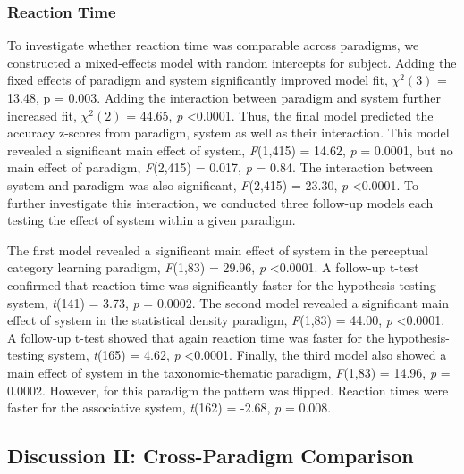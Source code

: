 \documentclass[../dissertation.tex]{subfiles}
\begin{document}
\subsubsection{Reaction Time}
To investigate whether reaction time was comparable across paradigms, we constructed a mixed-effects model with random intercepts for subject. Adding the fixed effects of paradigm and system significantly improved model fit,  $\chi^{2}(3)$ = 13.48, p = 0.003. Adding the interaction between paradigm and system further increased fit,  $\chi^{2}(2)$  = 44.65, \textit{p} \textless 0.0001. Thus, the final model predicted the accuracy z-scores from paradigm, system as well as their interaction. This model revealed a significant main effect of system, \textit{F}(1,415) = 14.62, \textit{p} = 0.0001, but no main effect of paradigm, \textit{F}(2,415) = 0.017, \textit{p} = 0.84. The interaction between system and paradigm was also significant, \textit{F}(2,415) = 23.30, \textit{p} \textless 0.0001. To further investigate this interaction, we conducted three follow-up models each testing the effect of system within a given paradigm. \par
	The first model revealed a significant main effect of system in the perceptual category learning paradigm, \textit{F}(1,83) = 29.96, \textit{p} \textless 0.0001. A follow-up t-test confirmed that reaction time was significantly faster for the hypothesis-testing system, \textit{t}(141) = 3.73, \textit{p} = 0.0002. The second model revealed a significant main effect of system in the statistical density paradigm, \textit{F}(1,83) = 44.00, \textit{p} \textless 0.0001. A follow-up t-test showed that again reaction time was faster for the hypothesis-testing system, \textit{t}(165) = 4.62, \textit{p} \textless 0.0001.  Finally, the third model also showed a main effect of system in the taxonomic-thematic paradigm, \textit{F}(1,83) = 14.96, \textit{p} = 0.0002. However, for this paradigm the pattern was flipped. Reaction times were faster for the associative system, \textit{t}(162) = -2.68, \textit{p} = 0.008.
	
\subsection{Discussion II: Cross-Paradigm Comparison}
\end{document}
